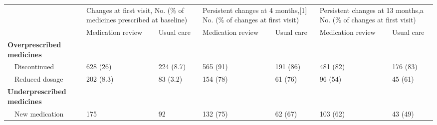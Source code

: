 \begin{table}[]
\begin{tabular}{lllllll}
\hline
\multirow{2}{*}{} & \multicolumn{2}{l}{Changes at first visit, No. (\%   of medicines prescribed at baseline)} & \multicolumn{2}{l}{Persistent changes at 4   months,{[}1{]} No. (\% of changes at first visit)} & \multicolumn{2}{l}{Persistent changes at 13   months,a No. (\% of   changes at first visit)} \\ \cline{2-7} 
                                   & Medication review                               & Usual care                               & Medication review                                  & Usual care                                 & Medication review                                & Usual care                                \\ \cline{1-1}
\textbf{Overprescribed medicines}  &                                                 &                                          &                                                    &                                            &                                                  &                                           \\
~~Discontinued           & 628 (26)                                        & 224 (8.7)                                & 565 (91)                                           & 191 (86)                                   & 481 (82)                                         & 176 (83)                                  \\
~~Reduced dosage         & 202 (8.3)                                       & 83 (3.2)                                 & 154 (78)                                           & 61 (76)                                    & 96 (54)                                          & 45 (61)                                   \\
\textbf{Underprescribed medicines} &                                                 &                                          &                                                    &                                            &                                                  &                                           \\
~~New medication         & 175                                             & 92                                       & 132 (75)                                           & 62 (67)                                    & 103 (62)                                         & 43 (49)                                   \\

\end{tabular}
\end{table}
